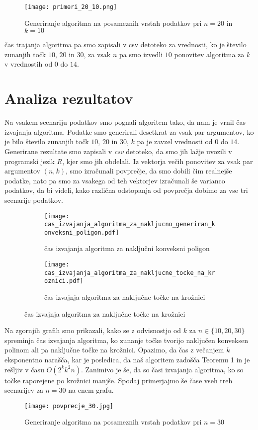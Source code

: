 \documentclass[a4paper, 11pt]{article}
\begin{document}
\begin{figure}[h!]
    \centering
    \texttt{[image: primeri\_20\_10.png]}
    \caption{Generiranje algoritma na posameznih vrstah podatkov pri $n=20$ in $k=10$}
\end{figure}



čas trajanja algoritma pa smo zapisali v csv detoteko za vrednosti, ko je število 
zunanjih točk $10$, $20$ in $30$, za vsak $n$ pa smo izvedli $10$ ponovitev algoritma za $k$ v vrednostih od $0$ do $14$.



\section{Analiza rezultatov}
Na vsakem scenariju podatkov smo pognali algoritem tako, da nam je vrnil čas
izvajanja algoritma.  Podatke smo generirali desetkrat za vsak par argumentov,
ko je bilo število zunanjih točk $10$, $20$ in $30$, $k$ pa je zavzel vrednosti od $0$ do $14$.
Generirane rezultate smo zapisali v \emph{csv} detoteko, da smo jih lažje uvozili
v programski jezik $R$, kjer smo jih obdelali. Iz vektorja večih ponovitev za vsak par argumentov $(n,k)$, smo izračunali 
povprečje, da smo dobili čim realnejše podatke, nato pa smo za vsakega od teh vektorjev izračunali še varianco podatkov, 
da bi videli, kako različna odstopanja od povprečja dobimo za vse tri scenarije podatkov.

\begin{figure}[h!]

	\begin{subfigure}[t]{0.45\textwidth}
		\centering
		\texttt{[image: cas\_izvajanja\_algoritma\_za\_nakljucno\_generiran\_konveksni\_poligon.pdf]}
		\caption{čas izvajanja algoritma za naključni konveksni poligon}
		\label{n_10_count}
	\end{subfigure}
	\hfill
	\begin{subfigure}[t]{0.45\textwidth}
		\centering
		\texttt{[image: cas\_izvajanja\_algoritma\_za\_nakljucne\_tocke\_na\_kroznici.pdf]}
		\caption{čas izvajnja algoritma za naključne točke na krožnici}
		\label{n_10_time}
	\end{subfigure}
    \label{fig:n_10}
\end{figure}

Na zgornjih grafih smo prikazali, kako se z odvisnostjo od $k$ za $n\in \{10,20,30\}$ spreminja čas izvajanja algoritma,
ko zunanje točke tvorijo naključen konveksen polinom ali pa naključne točke na krožnici. Opazimo, da čas z večanjem $k$
eksponentno narašča, kar je posledica, da naš algoritem zadošča Teoremu 1 in je rešljiv v času $O(2^kk^2n)$. Zanimivo je 
še, da so časi izvajanja algoritma, ko so točke raporejene po krožnici manjše. Spodaj primerjajmo še čase vseh treh scenarijev
za $n=30$ na enem grafu.
\begin{figure}[h!]
    \centering
    \texttt{[image: povprecje\_30.jpg]}
    \caption{Generiranje algoritma na posameznih vrstah podatkov pri $n=30$}
\end{figure}
\end{document}
